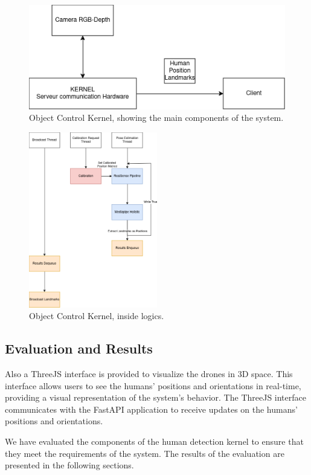 \begin{figure}[htbp]
    \centerline{\includegraphics{images/objectschema.png}}
    \caption{Object Control Kernel, showing the main components of the system.}
    \label{fig}
    \end{figure} 
\begin{figure}[htbp]
    \centerline{\includegraphics[width=0.5\textwidth]{images/ObjectRecognitionLogics.png}}
    \caption{Object Control Kernel, inside logics.}
    \label{fig}
    \end{figure} 

\subsection{Evaluation and Results}
Also a ThreeJS interface is provided to visualize the drones in \gls{3D} space. This interface allows users to see the humans' positions and orientations in real-time, providing a visual representation of the system's behavior. The ThreeJS interface communicates with the FastAPI application to receive updates on the humans' positions and orientations.

We have evaluated the components of the human detection kernel to ensure that they meet the requirements of the system. The results of the evaluation are presented in the following sections.

